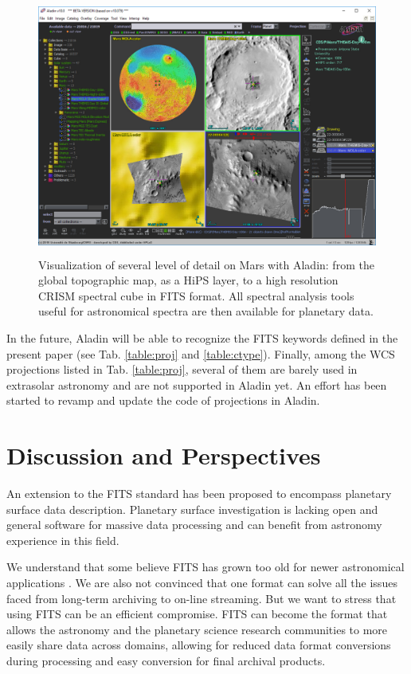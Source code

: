 \begin{figure}[ht!]
\centerline{\includegraphics[height=20pc]{ess_marmo6}}
\caption{Visualization of several level of detail on Mars with Aladin: from the
global topographic map, as a HiPS layer, to a high resolution CRISM spectral cube
in FITS format. All spectral analysis tools useful for astronomical spectra
are then available for planetary data.}
\label{fig:aladin}
\end{figure}

In the future, Aladin will be able to recognize the FITS keywords defined
in the present paper (see Tab. \ref{table:proj} and \ref{table:ctype}).
Finally, among the WCS projections listed in Tab. \ref{table:proj}, several of
them are barely used in extrasolar astronomy and are not supported in Aladin yet.
An effort has been started to revamp and update the code of projections in
Aladin.

\section{Discussion and Perspectives}
\label{sec:disc}
An extension to the FITS standard has been proposed to encompass planetary
surface data description.
Planetary surface investigation is lacking open and general software for massive data
processing and can benefit from astronomy experience in this field.

We understand that some believe FITS has grown too old for newer astronomical
applications \citep{THOMAS2015133}. We are also not convinced that one format
can solve all the issues faced from long-term archiving to on-line streaming.
But we want to stress that using FITS can be an efficient compromise.
FITS can become the format that allows the astronomy and the  planetary science 
research communities to more easily share data across domains, allowing for
reduced data format conversions during processing and easy conversion for final
archival products.

